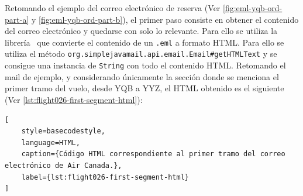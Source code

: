 Retomando el ejemplo del correo electrónico de reserva (Ver \autoref{fig:eml-yqb-ord-part-a} y
\autoref{fig:eml-yqb-ord-part-b}), el primer paso consiste en obtener el contenido del correo electrónico y quedarse con
solo lo relevante.
Para ello se utiliza la librería~\cite{simple-java-mail} que convierte el contenido de
un \texttt{.eml} a formato HTML\@.
Para ello se utiliza el método \texttt{org.simplejavamail.api.email.Email\#getHTMLText}
y se consigue una instancia de \texttt{String} con todo el contenido HTML\@.
Retomando el mail de ejemplo, y considerando únicamente la sección donde se menciona el primer tramo del vuelo, desde
YQB a YYZ, el HTML obtenido es el siguiente (Ver \autoref{lst:flight026-first-segment-html}):

\begin{lstlisting}[
    style=basecodestyle,
    language=HTML,
    caption={Código HTML correspondiente al primer tramo del correo electrónico de Air Canada.},
    label={lst:flight026-first-segment-html}
]

\end{lstlisting}
